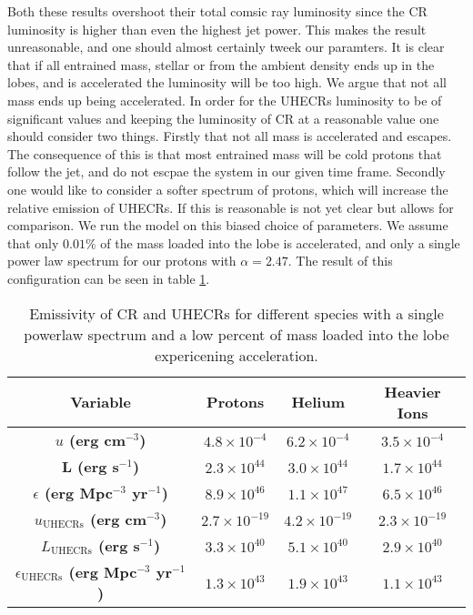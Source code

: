 Both these results overshoot their total comsic ray luminosity since the CR luminosity is higher than even the highest jet power. This makes the result unreasonable, and one should almost certainly tweek our paramters. It is clear that if all entrained mass, stellar or from the ambient density ends up in the lobes, and is accelerated the luminosity will be too high. We argue that not all mass ends up being accelerated. In order for the UHECRs luminosity to be of significant values and keeping the luminosity of CR at a reasonable value one should consider two things. Firstly that not all mass is accelerated and escapes. The consequence of this is that most entrained mass will be cold protons that follow the jet, and do not escpae the system in our given time frame. Secondly one would like to consider a softer spectrum of protons, which will increase the relative emission of UHECRs. If this is reasonable is not yet clear but allows for comparison. We run the model on this biased choice of parameters. We  assume that only $0.01\%$ of the mass loaded into the lobe is accelerated, and only a single power law spectrum for our protons with $\alpha = 2.47$. The result of this configuration can be seen in table \ref{tab:emissivity_mass_load_1}.
\begin{table}[H]
    \centering
    \begin{tabular}{|c|c|c|c|}
    \hline
    \textbf{Variable} & \textbf{Protons} & \textbf{Helium} & \textbf{Heavier Ions} \\
    \hline
    \textbf{$u$ (erg cm$^{-3}$)} & \(4.8 \times 10^{-4}\) & \(6.2 \times 10^{-4}\) & \(3.5 \times 10^{-4}\) \\
    \hline
    \textbf{L (erg s$^{-1}$)} & \(2.3 \times 10^{44}\) & \(3.0 \times 10^{44}\) & \(1.7 \times 10^{44}\) \\
    \hline
    \textbf{$\epsilon$ (erg Mpc$^{-3}$ yr$^{-1}$)} & \(8.9 \times 10^{46}\) & \(1.1 \times 10^{47}\) & \(6.5 \times 10^{46}\) \\
    \hline
    \textbf{$u_{\text{UHECRs}}$ (erg cm$^{-3}$)} & \(2.7 \times 10^{-19}\) & \(4.2 \times 10^{-19}\) & \(2.3 \times 10^{-19}\) \\
    \hline
    \textbf{$L_{\text{UHECRs}}$ (erg s$^{-1}$)} & \(3.3 \times 10^{40}\) & \(5.1 \times 10^{40}\) & \(2.9 \times 10^{40}\) \\
    \hline
    \textbf{$\epsilon_{\text{UHECRs}}$  (erg Mpc$^{-3}$ yr$^{-1}$)} & \(1.3 \times 10^{43}\) & \(1.9 \times 10^{43}\) & \(1.1 \times 10^{43}\) \\
    \hline
    \end{tabular}
    \caption{Emissivity of CR and UHECRs for different species with a single powerlaw spectrum and a low percent of mass loaded into the lobe expericening acceleration.}
    \label{tab:emissivity_mass_load_1}
\end{table}


